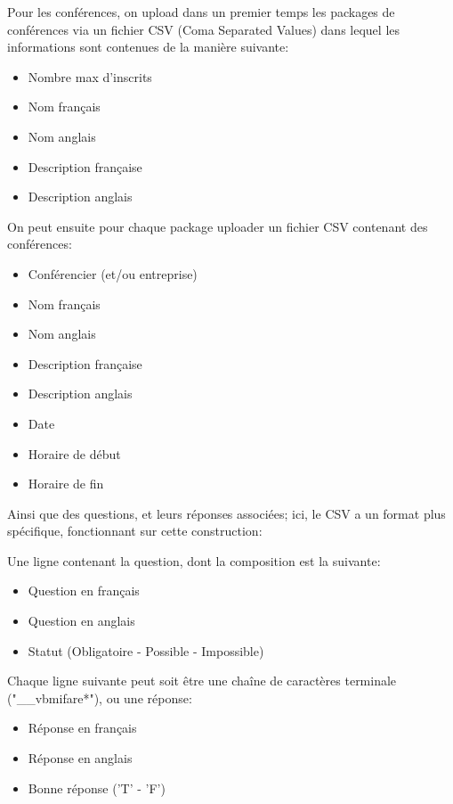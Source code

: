     Pour les conférences, on upload dans un premier temps les packages de conférences via un fichier CSV (Coma Separated Values)
    dans lequel les informations sont contenues de la manière suivante:

    \begin{itemize}
    \item Nombre max d'inscrits
    \item Nom français
    \item Nom anglais
    \item Description française
    \item Description anglais
    \end{itemize}

    On peut ensuite pour chaque package uploader un fichier CSV contenant des conférences:

    \begin{itemize}
    \item Conférencier (et/ou entreprise)
    \item Nom français
    \item Nom anglais
    \item Description française
    \item Description anglais
    \item Date
    \item Horaire de début
    \item Horaire de fin
    \end{itemize}

    Ainsi que des questions, et leurs réponses associées; ici, le CSV a un format plus spécifique, fonctionnant sur cette construction:
    
    Une ligne contenant la question, dont la composition est la suivante:

    \begin{itemize}
    \item Question en français
    \item Question en anglais
    \item Statut (Obligatoire - Possible - Impossible)
    \end{itemize}

    Chaque ligne suivante peut soit être une chaîne de caractères terminale ("__vbmifare*"), ou une réponse:

    \begin{itemize}
    \item Réponse en français
    \item Réponse en anglais
    \item Bonne réponse ('T' - 'F')
    \end{itemize}

